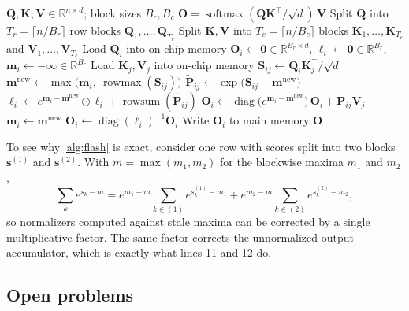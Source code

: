 \documentclass[11pt]{article}
\DeclareMathOperator{\softmax}{softmax}
\DeclareMathOperator{\rowmax}{rowmax}
\DeclareMathOperator{\rowsum}{rowsum}
\DeclareMathOperator{\diag}{diag}
\newcommand{\R}{\mathbb{R}}
\newcommand{\mQ}{\mathbf{Q}}
\newcommand{\mK}{\mathbf{K}}
\newcommand{\mV}{\mathbf{V}}
\newcommand{\mO}{\mathbf{O}}
\begin{document}
\begin{algorithm}[t]
  \caption{Tiled exact attention with online softmax (forward pass)}
  \label{alg:flash}
  \begin{algorithmic}[1]
    \Require $\mQ, \mK, \mV \in \R^{n \times d}$; block sizes $B_r, B_c$
    \Ensure $\mO = \softmax(\mQ\mK^\top / \sqrt{d})\,\mV$
    \State Split $\mQ$ into $T_r = \lceil n / B_r \rceil$ row blocks $\mQ_1, \dots, \mQ_{T_r}$
    \State Split $\mK, \mV$ into $T_c = \lceil n / B_c \rceil$ blocks $\mK_1, \dots, \mK_{T_c}$ and $\mV_1, \dots, \mV_{T_c}$
     
      \State Load $\mQ_i$ into on-chip memory
      \State $\mO_i \gets \mathbf{0} \in \R^{B_r \times d}$, \quad $\bm{\ell}_i \gets \mathbf{0} \in \R^{B_r}$, \quad $\bm{m}_i \gets -\bm{\infty} \in \R^{B_r}$
        \State Load $\mK_j, \mV_j$ into on-chip memory
        \State $\mathbf{S}_{ij} \gets \mQ_i \mK_j^\top / \sqrt{d}$ 
        \State $\bm{m}^{\text{new}} \gets \max\bigl(\bm{m}_i,\ \rowmax(\mathbf{S}_{ij})\bigr)$
        \State $\tilde{\mathbf{P}}_{ij} \gets \exp\bigl(\mathbf{S}_{ij} - \bm{m}^{\text{new}}\bigr)$ 
        \State $\bm{\ell}_i \gets e^{\bm{m}_i - \bm{m}^{\text{new}}} \odot \bm{\ell}_i + \rowsum(\tilde{\mathbf{P}}_{ij})$
        \State $\mO_i \gets \diag\bigl(e^{\bm{m}_i - \bm{m}^{\text{new}}}\bigr)\, \mO_i + \tilde{\mathbf{P}}_{ij} \mV_j$
        \State $\bm{m}_i \gets \bm{m}^{\text{new}}$
      \EndFor
      \State $\mO_i \gets \diag(\bm{\ell}_i)^{-1} \mO_i$ 
      \State Write $\mO_i$ to main memory
    \EndFor
    \State \Return $\mO$
  \end{algorithmic}
\end{algorithm}

To see why \cref{alg:flash} is exact, consider one row with scores split into two blocks $\bm{s}^{(1)}$ and $\bm{s}^{(2)}$. With $m = \max(m_1, m_2)$ for the blockwise maxima $m_1$ and $m_2$,
\begin{equation}
  \sum_k e^{s_k - m} = e^{m_1 - m} \sum_{k \in (1)} e^{s^{(1)}_k - m_1} + e^{m_2 - m} \sum_{k \in (2)} e^{s^{(2)}_k - m_2},
\end{equation}
so normalizers computed against stale maxima can be corrected by a single multiplicative factor. The same factor corrects the unnormalized output accumulator, which is exactly what lines 11 and 12 do.

\subsection{Open problems}
\label{sec:open}
\end{document}
